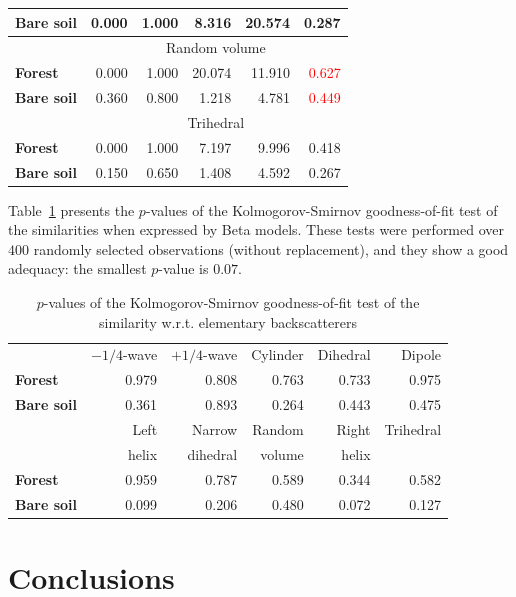 \documentclass[conference]{IEEEtran}
\begin{document}
\begin{table}[hbt]
\begin{tabular}{lrrrrr}
\textbf{Bare soil} & 0.000 & 1.000 & 8.316 & 20.574 & 0.287\\
\midrule
%
& \multicolumn{5}{c}{Random volume}\\
\cmidrule(lr){2-6}
\textbf{Forest} & 0.000 & 1.000 & 20.074 & 11.910 & \textcolor{red}{0.627}\\
\textbf{Bare soil} & 0.360 & 0.800 & 1.218 & 4.781 & \textcolor{red}{0.449}\\
\midrule
%
& \multicolumn{5}{c}{Trihedral}\\
\cmidrule(lr){2-6}
\textbf{Forest} & 0.000 & 1.000 & 7.197 & 9.996 & 0.418\\
\textbf{Bare soil} & 0.150 & 0.650 & 1.408 & 4.592 & 0.267\\
\bottomrule
\end{tabular}
\end{table}

Table~\ref{tab:pvalues_table} presents the $p$-values of the Kolmogorov-Smirnov goodness-of-fit test of the similarities when expressed by Beta models.
These tests were performed over $400$ randomly selected observations (without replacement), and they show a good adequacy: the smallest $p$-value is $0.07$.

\begin{table}[hbt]
\centering
\caption{$p$-values of the Kolmogorov-Smirnov goodness-of-fit test of the similarity w.r.t. elementary backscatterers}\label{tab:pvalues_table}
\begin{tabular}{lrrrrr}
\toprule
& $-1/4$-wave & $+1/4$-wave & Cylinder & Dihedral & Dipole\\
\cmidrule(lr){2-6}
\textbf{Forest} & 0.979 & 0.808 & 0.763 & 0.733 & 0.975\\
\textbf{Bare soil} & 0.361 & 0.893 & 0.264 & 0.443 & 0.475\\
\midrule
& Left & Narrow & Random & Right & Trihedral\\
             & helix & dihedral & volume & helix & \\
\cmidrule(lr){2-6}
\textbf{Forest} & 0.959 & 0.787 & 0.589 & 0.344 & 0.582\\
\textbf{Bare soil} & 0.099 & 0.206 & 0.480 & 0.072 & 0.127\\
\bottomrule
\end{tabular} 
\end{table}

\section{Conclusions}
\end{document}
